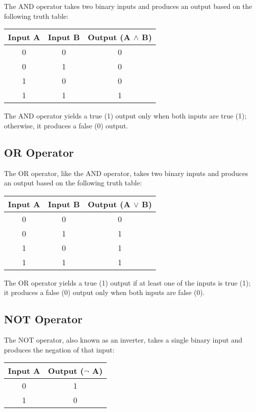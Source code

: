 \documentclass{article}
\begin{document}
The AND operator takes two binary inputs and produces an output based on the following truth table:

\begin{center}
  \begin{tabular}{|c|c|c|}
    \hline
    \textbf{Input A} & \textbf{Input B} & \textbf{Output (A $\land$ B)} \\
    \hline
    0 & 0 & 0 \\
    0 & 1 & 0 \\
    1 & 0 & 0 \\
    1 & 1 & 1 \\
    \hline
  \end{tabular}
\end{center}

The AND operator yields a true (1) output only when both inputs are true (1); otherwise, it produces a false (0) output.

\subsection{OR Operator}

The OR operator, like the AND operator, takes two binary inputs and produces an output based on the following truth table:

\begin{center}
  \begin{tabular}{|c|c|c|}
    \hline
    \textbf{Input A} & \textbf{Input B} & \textbf{Output (A $\lor$ B)} \\
    \hline
    0 & 0 & 0 \\
    0 & 1 & 1 \\
    1 & 0 & 1 \\
    1 & 1 & 1 \\
    \hline
  \end{tabular}
\end{center}

The OR operator yields a true (1) output if at least one of the inputs is true (1); it produces a false (0) output only when both inputs are false (0).

\subsection{NOT Operator}

The NOT operator, also known as an inverter, takes a single binary input and produces the negation of that input:

\begin{center}
  \begin{tabular}{|c|c|}
    \hline
    \textbf{Input A} & \textbf{Output ($\lnot$ A)} \\
    \hline
    0 & 1 \\
    1 & 0 \\
    \hline
  \end{tabular}
\end{center}
\end{document}
